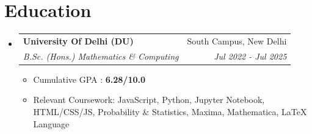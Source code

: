 \documentclass[letterpaper,10pt]{article}
\makeatletter
\newcommand{\resumeItem}[1]{
  \item\small{
    {#1 \vspace{-3pt}}
  }
}
\newcommand{\resumeSubheading}[4]{
  \vspace{-2pt}\item
    \begin{tabular*}{0.97\textwidth}[t]{l@{\extracolsep{\fill}}r}
      \textbf{#1} & #2 \\
      \textit{\small#3} & \textit{\small #4} \\
    \end{tabular*}\vspace{-7pt}
}
\newcommand{\resumeSubSubheading}[2]{
    \item
    \begin{tabular*}{0.97\textwidth}{l@{\extracolsep{\fill}}r}
      \textit{\small#1} & \textit{\small #2} \\
    \end{tabular*}\vspace{-7pt}
}
\newcommand{\resumeSubHeadingListStart}{\begin{itemize}[leftmargin=0.15in, label={}]}
\newcommand{\resumeSubHeadingListEnd}{\end{itemize}}
\newcommand{\resumeItemListStart}{\begin{itemize}}
\newcommand{\resumeItemListEnd}{\end{itemize}\vspace{-4pt}}
\makeatother
\begin{document}




\section{Education}
  \resumeSubHeadingListStart
    \resumeSubheading
      {University Of Delhi (DU)}{ South Campus, New Delhi}
      {B.Sc. (Hons.) Mathematics \& Computing}{Jul 2022 - Jul 2025}
      \resumeItemListStart
        \resumeItem{Cumulative GPA : \textbf{6.28/10.0}}
        \resumeItem{Relevant Coursework: JavaScript, Python, Jupyter Notebook, HTML/CSS/JS, Probability \& Statistics, Maxima, Mathematica, LaTeX Language}
      \resumeItemListEnd
  \resumeSubHeadingListEnd

\end{document}

